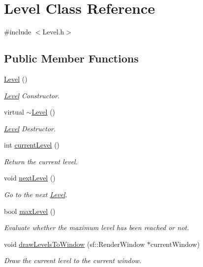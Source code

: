 \hypertarget{class_level}{}\section{Level Class Reference}
\label{class_level}


{\ttfamily \#include $<$Level.\+h$>$}

\subsection*{Public Member Functions}
\begin{DoxyCompactItemize}
\item 
\hyperlink{class_level_a7a696c928ca5d5354db6e50e46d0f67d}{Level} ()
\begin{DoxyCompactList}\small\item\em \hyperlink{class_level}{Level} Constructor. \end{DoxyCompactList}\item 
virtual \hyperlink{class_level_a249eac1e8f19ff44134efa5e986feaca}{$\sim$\+Level} ()
\begin{DoxyCompactList}\small\item\em \hyperlink{class_level}{Level} Destructor. \end{DoxyCompactList}\item 
int \hyperlink{class_level_a7ee14ca534888973fab088e511db1341}{current\+Level} ()
\begin{DoxyCompactList}\small\item\em Return the current level. \end{DoxyCompactList}\item 
void \hyperlink{class_level_a9e00624c99565b0bc3cedf7b7971818e}{next\+Level} ()
\begin{DoxyCompactList}\small\item\em Go to the next \hyperlink{class_level}{Level}. \end{DoxyCompactList}\item 
bool \hyperlink{class_level_a702a1a057a4572ea37b701126501621a}{max\+Level} ()
\begin{DoxyCompactList}\small\item\em Evaluate whether the maximum level has been reached or not. \end{DoxyCompactList}\item 
void \hyperlink{class_level_a4cdf43966bbd49ea4f392762c4cd7991}{draw\+Levels\+To\+Window} (sf\+::\+Render\+Window $\ast$current\+Window)
\begin{DoxyCompactList}\small\item\em Draw the current level to the current window. \end{DoxyCompactList}\end{DoxyCompactItemize}
